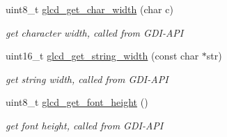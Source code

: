 \begin{CompactItemize}
uint8\_\-t \hyperlink{group__graphic__device__font_gac9f46ba71240ab10226e2301453baca}{glcd\_\-get\_\-char\_\-width} (char c)
\begin{CompactList}\small\item\em get character width, called from GDI-API \item\end{CompactList}\item 
uint16\_\-t \hyperlink{group__graphic__device__font_g7139ef355833e99644e2149b6e908759}{glcd\_\-get\_\-string\_\-width} (const char $\ast$str)
\begin{CompactList}\small\item\em get string width, called from GDI-API \item\end{CompactList}\item 
uint8\_\-t \hyperlink{group__graphic__device__font_g98c36633bb1b0db1ac26c4b07a392d2c}{glcd\_\-get\_\-font\_\-height} ()
\begin{CompactList}\small\item\em get font height, called from GDI-API \item\end{CompactList}\end{CompactItemize}
